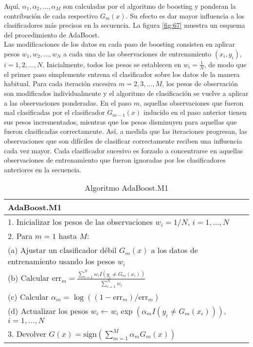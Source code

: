 Aquí, $\alpha_1, \alpha_2, \dots, \alpha_M$ son calculadas por el algoritmo de boosting y ponderan la contribución de cada respectivo $G_m(x)$. Su efecto es dar mayor influencia a los clasificadores más precisos en la secuencia. La figura \ref{fig:67} muestra un esquema del procedimiento de AdaBoost. \\

Las modificaciones de los datos en cada paso de boosting consisten en aplicar pesos $w_1, w_2, \dots, w_N$ a cada una de las observaciones de entrenamiento $(x_i, y_i)$, $i = 1, 2, \dots, N$. Inicialmente, todos los pesos se establecen en $w_i = \frac{1}{N}$, de modo que el primer paso simplemente entrena el clasificador sobre los datos de la manera habitual. Para cada iteración sucesiva $m = 2, 3, \dots, M$, los pesos de observación son modificados individualmente y el algoritmo de clasificación se vuelve a aplicar a las observaciones ponderadas. En el paso $m$, aquellas observaciones que fueron mal clasificadas por el clasificador $G_{m-1}(x)$ inducido en el paso anterior tienen sus pesos incrementados, mientras que los pesos disminuyen para aquellas que fueron clasificadas correctamente. Así, a medida que las iteraciones progresan, las observaciones que son difíciles de clasificar correctamente reciben una influencia cada vez mayor. Cada clasificador sucesivo es forzado a concentrarse en aquellas observaciones de entrenamiento que fueron ignoradas por los clasificadores anteriores en la secuencia. \\

\begin{table}[h]
\centering
\begin{tabular}{l}
\toprule\toprule
\textbf{AdaBoost.M1} \\
\midrule\midrule
1. Inicializar los pesos de las observaciones $w_i = 1/N$, $i = 1, \dots, N$ \\
2. Para $m = 1$ hasta $M$: \\
\quad (a) Ajustar un clasificador débil $G_m(x)$ a los datos de entrenamiento usando los pesos $w_i$ \\
\quad (b) Calcular $\displaystyle \text{err}_m = \frac{\sum_{i=1}^{N} w_i I(y_i \neq G_m(x_i))}{\sum_{i=1}^{N} w_i}$ \\
\quad (c) Calcular $\displaystyle \alpha_m = \log \left((1 - \text{err}_m)/\text{err}_m \right)$ \\
\quad (d) Actualizar los pesos $w_i \leftarrow w_i \exp \left( \alpha_m I(y_i \neq G_m(x_i)) \right)$, $i = 1, \dots, N$ \\
3. Devolver $G(x) = \text{sign} \left( \sum_{m=1}^{M} \alpha_m G_m(x) \right)$ \\
\bottomrule\bottomrule
\end{tabular}
\caption{Algoritmo AdaBoost.M1}
\label{tb:10.1}
\end{table}



